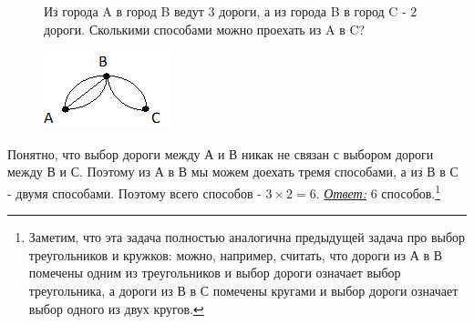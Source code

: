 \begin{figure}[!h]
\begin{minipage}{0.84\linewidth}\setlength{\parindent}{1.5em}
\begin{thm}
	Из города A в город B ведут 3 дороги, а из города B в город C - 2 дороги. Сколькими способами можно проехать из A в C? 
\end{thm}
\end{minipage}
\begin{minipage}{0.15\linewidth}
    \includegraphics[scale=4]{./img/ways}
\end{minipage}
\end{figure}

\begin{prf} Понятно, что выбор дороги между А и В никак не связан с выбором дороги между В и С. Поэтому из А в В мы можем доехать тремя способами, а из В в С - двумя способами. Поэтому всего способов - $3 \times 2 = 6$. \underline{\textit{Ответ:}} 6 способов.\footnote{Заметим, что эта задача полностью аналогична предыдущей задача про выбор треугольников и кружков: можно, например, считать, что дороги из А в В помечены одним из треугольников и выбор дороги означает выбор треугольника, а дороги из В в С помечены кругами и выбор дороги означает выбор одного из двух кругов.}
\end{prf}

